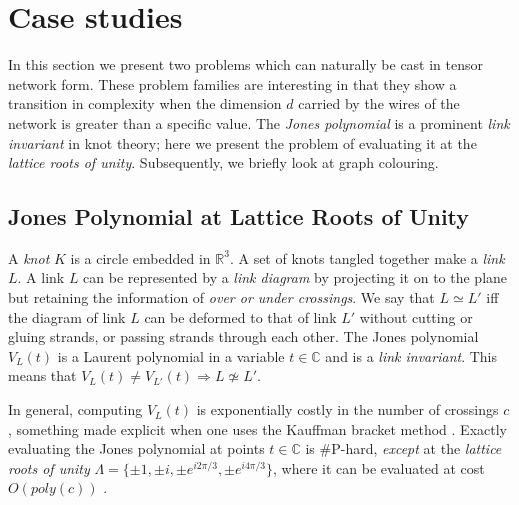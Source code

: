 \section{Case studies}

In this section we present two problems which can naturally be cast in tensor network form.
These problem families are interesting in that they show a transition in complexity when the dimension $d$ carried by the wires of the network is greater than a specific value. The \emph{Jones polynomial} is a prominent \emph{link invariant} in knot theory; here we present the problem of evaluating it at the \emph{lattice roots of unity}.
Subsequently, we briefly look at graph colouring.

\subsection{Jones Polynomial at Lattice Roots of Unity}


A \emph{knot} $K$ is a circle embedded in $\mathbb{R}^3$.
A set of knots tangled together make a \emph{link} $L$.
A link $L$ can be represented by a \emph{link diagram}
by projecting it on to the plane
but retaining the information of \emph{over or under crossings}.
We say that $L\simeq L'$ iff the diagram of link $L$ can be deformed to that of link $L'$ without cutting or gluing strands, or passing strands through each other.
The Jones polynomial $V_L(t)$
is a Laurent polynomial in a variable $t\in\mathbb{C}$
and is a \emph{link invariant}.
This means that
$V_L(t)\neq V_{L'}(t)\Rightarrow L\not\simeq L'$.

In general, computing $V_L(t)$
is exponentially costly in the number of crossings $c$,
something made explicit when one uses the Kauffman bracket method \cite{Kauffman2001}.
Exactly evaluating the Jones polynomial at points $t\in\mathbb{C}$ is \#P-hard,
\emph{except} at the \emph{lattice roots of unity} $\Lambda = \{ \pm 1, \pm i, \pm e^{i 2\pi/3}, \pm e^{i 4\pi/3} \}$,
where it can be evaluated at cost $O(poly(c))$ \cite{jaeger_vertigan_welsh_1990}.



